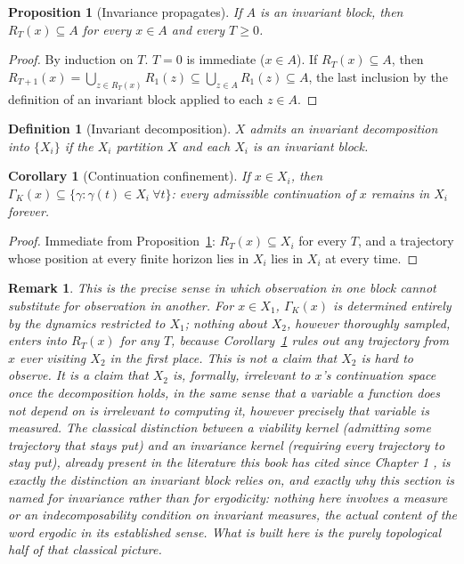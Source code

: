 \documentclass[11pt]{report}
\newtheorem{proposition}{Proposition}[chapter]
\newtheorem{definition}{Definition}[chapter]
\newtheorem{remark}{Remark}[chapter]
\newtheorem{corollary}{Corollary}[chapter]
\begin{document}
\begin{proposition}[Invariance propagates]
\label{prop:invpropagate}
If $A$ is an invariant block, then $R_T(x) \subseteq A$ for every $x
\in A$ and every $T \geq 0$.
\end{proposition}
\begin{proof}
By induction on $T$. $T=0$ is immediate ($x \in A$). If $R_T(x)
\subseteq A$, then $R_{T+1}(x) = \bigcup_{z \in R_T(x)} R_1(z)
\subseteq \bigcup_{z \in A} R_1(z) \subseteq A$, the last inclusion
by the definition of an invariant block applied to each $z \in A$.
\end{proof}

\begin{definition}[Invariant decomposition]
$X$ admits an invariant decomposition into $\{X_i\}$ if the $X_i$
partition $X$ and each $X_i$ is an invariant block.
\end{definition}

\begin{corollary}[Continuation confinement]
\label{cor:confine}
If $x \in X_i$, then $\Gamma_K(x) \subseteq \{\gamma : \gamma(t) \in
X_i \ \forall t\}$: every admissible continuation of $x$ remains in
$X_i$ forever.
\end{corollary}
\begin{proof}
Immediate from Proposition~\ref{prop:invpropagate}: $R_T(x) \subseteq
X_i$ for every $T$, and a trajectory whose position at every finite
horizon lies in $X_i$ lies in $X_i$ at every time.
\end{proof}

\begin{remark}
This is the precise sense in which observation in one block cannot
substitute for observation in another. For $x \in X_1$, $\Gamma_K(x)$
is determined entirely by the dynamics restricted to $X_1$; nothing
about $X_2$, however thoroughly sampled, enters into $R_T(x)$ for any
$T$, because Corollary~\ref{cor:confine} rules out any trajectory from
$x$ ever visiting $X_2$ in the first place. This is not a claim that
$X_2$ is hard to observe. It is a claim that $X_2$ is, formally,
irrelevant to $x$'s continuation space once the decomposition holds,
in the same sense that a variable a function does not depend on is
irrelevant to computing it, however precisely that variable is
measured. The classical distinction between a viability kernel
(admitting \emph{some} trajectory that stays put) and an invariance
kernel (requiring \emph{every} trajectory to stay put), already
present in the literature this book has cited since Chapter 1
\cite{aubinframkowska1990}, is exactly the distinction an invariant
block relies on, and exactly why this section is named for invariance
rather than for ergodicity: nothing here involves a measure or an
indecomposability condition on invariant measures, the actual content
of the word ergodic in its established sense. What is built here is
the purely topological half of that classical picture.
\end{remark}
\end{document}
